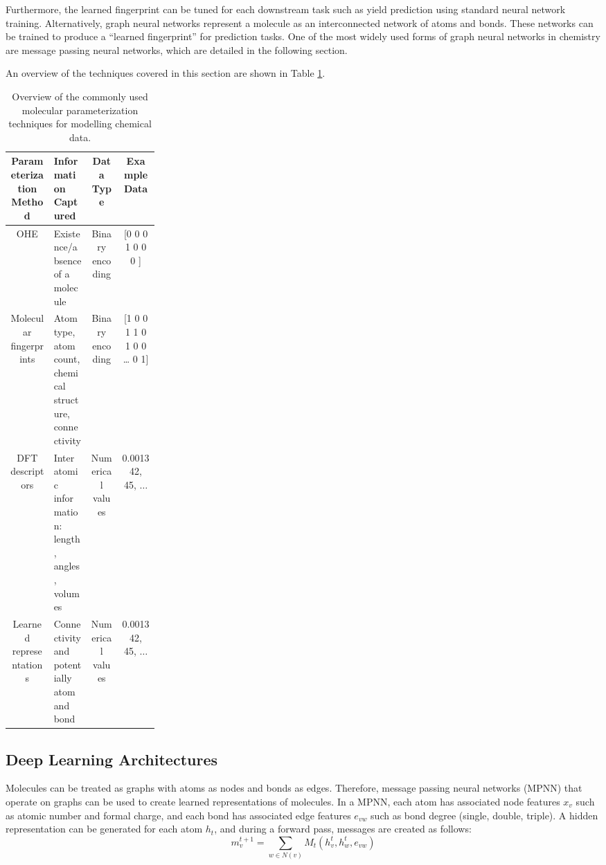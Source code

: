 Furthermore, the learned fingerprint can be tuned for each downstream task such as yield prediction using standard neural network training. Alternatively, graph neural networks represent a molecule as an interconnected network of atoms and bonds. These networks can be trained to produce a “learned fingerprint” for prediction tasks. One of the most widely used forms of graph neural networks in chemistry are message passing neural networks, which are detailed in the following section.

An overview of the techniques covered in this section are shown in Table \ref{tab:parameterization}.

\begin{table}
    \caption{Overview of the commonly used molecular parameterization techniques for modelling chemical data.}
    \begin{tabular}{cp{0.25\linewidth}cc}
         Parameterization
    Method & Information Captured & Data Type & Example Data  \\
        \hline
         OHE & Existence/absence of a molecule & Binary encoding & [0 0 0 1 0 0 0 ] \\
         Molecular fingerprints & Atom type, atom count, chemical structure, connectivity & Binary encoding & [1 0 0 1 1 0 1 0 0 … 0 1] \\
         DFT descriptors & Inter atomic information: length, angles, volumes &  Numerical values & 0.001342, 45, $\dots$ \\
         Learned representations & Connectivity and potentially atom and bond & Numerical values & 0.001342, 45, $\dots$
    \end{tabular}
    \label{tab:parameterization}
\end{table}

\subsection{Deep Learning Architectures}

Molecules can be treated as graphs with atoms as nodes and bonds as edges. Therefore, message passing neural networks (MPNN) that operate on graphs can be used to create learned representations of molecules\cite{Gilmer2017}.  In a MPNN, each atom has associated node features $x_v$ such as atomic number and formal charge, and each bond has associated edge features $e_{vw}$ such as bond degree (single, double, triple). A hidden representation can be generated for each atom $h_t$, and  during a forward pass, messages are created as follows:
\begin{equation}
    m_v^{t+1} = \sum_{w\in N(v)} M_t(h_v^t, h_w^t, e_{vw})
\end{equation}

